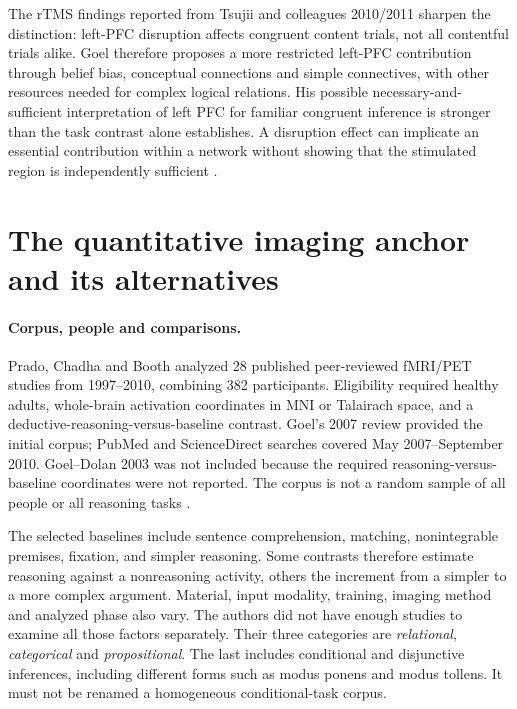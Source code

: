 The rTMS findings reported from Tsujii and colleagues 2010/2011 sharpen
the distinction: left-PFC disruption affects congruent content trials,
not all contentful trials alike. Goel therefore proposes a more restricted
left-PFC contribution through belief bias, conceptual connections and
simple connectives, with other resources needed for complex logical
relations. His possible necessary-and-sufficient interpretation of left
PFC for familiar congruent inference is stronger than the task contrast
alone establishes. A disruption effect can implicate an essential
contribution within a network without showing that the stimulated region
is independently sufficient \cite[p.~121]{Goel2021RationalityBrain}.

\section{The quantitative imaging anchor and its alternatives}
\label{sec:p19-r14-meta}

\paragraph{Corpus, people and comparisons.}
Prado, Chadha and Booth analyzed 28 published peer-reviewed fMRI/PET
studies from 1997--2010, combining 382 participants. Eligibility required
healthy adults, whole-brain activation coordinates in MNI or Talairach
space, and a deductive-reasoning-versus-baseline contrast. Goel's 2007
review provided the initial corpus; PubMed and ScienceDirect searches
covered May 2007--September 2010. Goel--Dolan 2003 was not included because
the required reasoning-versus-baseline coordinates were not reported.
The corpus is not a random sample of all people or all reasoning tasks
\cite[pp.~3484--3488, table~1]{PradoChadhaBooth2011DeductionMeta}.

The selected baselines include sentence comprehension, matching,
nonintegrable premises, fixation, and simpler reasoning. Some contrasts
therefore estimate reasoning against a nonreasoning activity, others the
increment from a simpler to a more complex argument. Material, input
modality, training, imaging method and analyzed phase also vary. The
authors did not have enough studies to examine all those factors
separately. Their three categories are \emph{relational}, \emph{categorical}
and \emph{propositional}. The last includes conditional and disjunctive
inferences, including different forms such as modus ponens and modus
tollens. It must not be renamed a homogeneous conditional-task corpus.

